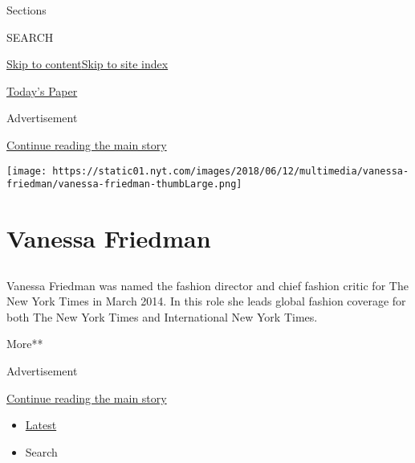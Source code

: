 Sections

SEARCH

\protect\hyperlink{site-content}{Skip to
content}\protect\hyperlink{site-index}{Skip to site index}

\href{https://myaccount.nytimes.com/auth/login?response_type=cookie\&client_id=vi}{}

\href{https://www.nytimes.com/section/todayspaper}{Today's Paper}

Advertisement

\protect\hyperlink{after-top}{Continue reading the main story}

\texttt{[image: https://static01.nyt.com/images/2018/06/12/multimedia/vanessa-friedman/vanessa-friedman-thumbLarge.png]}

\hypertarget{vanessa-friedman}{%
\section{Vanessa Friedman}\label{vanessa-friedman}}

\subsection{}

Vanessa Friedman was named the fashion director and chief fashion critic
for The New York Times in March 2014. In this role she leads global
fashion coverage for both The New York Times and International New York
Times.

More**

Advertisement

\protect\hyperlink{after-mid1}{Continue reading the main story}

\begin{itemize}
\tightlist
\item
  \protect\hyperlink{stream-panel}{Latest}
\item
  Search
\end{itemize}

